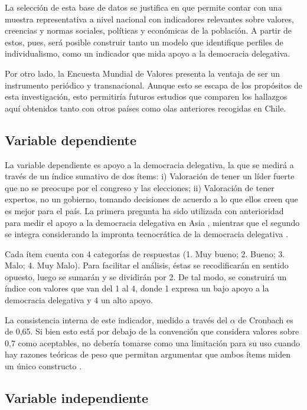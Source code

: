 \documentclass[12pt,twoside]{templates/facsothesis}
\begin{document}
La selección de esta base de datos se justifica en que permite contar con una muestra representativa a nivel nacional con indicadores relevantes sobre valores, creencias y normas sociales, políticas y económicas de la población. A partir de estos, pues, será posible construir tanto un modelo que identifique perfiles de individualismo, como un indicador que mida apoyo a la democracia delegativa.

Por otro lado, la Encuesta Mundial de Valores presenta la ventaja de ser un instrumento periódico y transnacional. Aunque esto se escapa de los propósitos de esta investigación, esto permitiría futuros estudios que comparen los hallazgos aquí obtenidos tanto con otros países como olas anteriores recogidas en Chile.

\hypertarget{variable-dependiente}{%
\subsection{Variable dependiente}\label{variable-dependiente}}

La variable dependiente es apoyo a la democracia delegativa, la que se medirá a través de un índice sumativo de dos ítems: i) Valoración de tener un líder fuerte que no se preocupe por el congreso y las elecciones; ii) Valoración de tener expertos, no un gobierno, tomando decisiones de acuerdo a lo que ellos creen que es mejor para el país. La primera pregunta ha sido utilizada con anterioridad para medir el apoyo a la democracia delegativa en Asia \citep{kang2018a}, mientras que el segundo se integra considerando la impronta tecnocrática de la democracia delegativa \citep{odonnell1994}.

Cada ítem cuenta con 4 categorías de respuestas (1. Muy bueno; 2. Bueno; 3. Malo; 4. Muy Malo). Para facilitar el análisis, éstas se recodificarán en sentido opuesto, luego se sumarán y se dividirán por 2. De tal modo, se construirá un índice con valores que van del 1 al 4, donde 1 expresa un bajo apoyo a la democracia delegativa y 4 un alto apoyo.

La consistencia interna de este indicador, medido a través del \(\alpha\) de Cronbach es de 0,65. Si bien esto está por debajo de la convención que considera valores sobre 0,7 como aceptables, no debería tomarse como una limitación para su uso cuando hay razones teóricas de peso que permitan argumentar que ambos ítems miden un único constructo \citep{schmitt1996}.

\hypertarget{variable-independiente}{%
\subsection{Variable independiente}\label{variable-independiente}}
\end{document}
